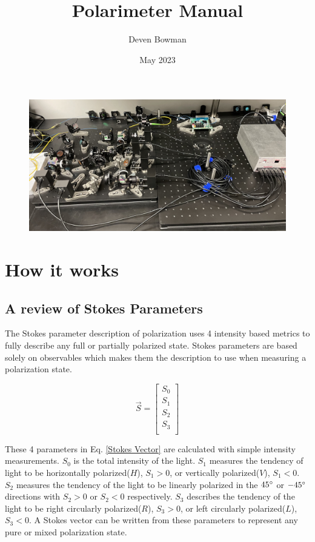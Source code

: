 \documentclass{article}
\title{Polarimeter Manual}
\author{Deven Bowman}
\date{May 2023}
\begin{document}
\maketitle

\begin{figure}[h]
    \centering
    \includegraphics[width = \textwidth]{refs_figures/Polarimeter Overview.jpg}
    \label{Polarimeter_pic}
\end{figure}


\section{How it works}
\subsection{A review of Stokes Parameters}
The Stokes parameter description of polarization uses 4 intensity based metrics to fully describe any full or partially polarized state. Stokes parameters are based solely on observables which makes them the description to use when measuring a polarization state.

\begin{equation}
    \Vec{S}= \begin{bmatrix}
    S_0\\
    S_1\\
    S_2\\
    S_3\\
    \end{bmatrix}
    \label{Stokes Vector}
\end{equation}

These 4 parameters in Eq. \ref{Stokes Vector} are calculated with simple intensity measurements. $S_0$ is the total intensity of the light. $S_1$ measures the tendency of light to be horizontally polarized($H$), $S_1 > 0$, or vertically polarized($V$), $S_1 < 0$. $S_2$ measures the tendency of the light to be linearly polarized in the $45\degree$ or $-45\degree$ directions with $S_2 >0$ or $S_2<0$ respectively. $S_3$ describes the tendency of the light to be right circularly polarized($R$), $S_3 >0$, or left circularly polarized($L$), $S_3<0$. A Stokes vector can be written from these parameters to represent any pure or mixed polarization state. 
\end{document}

